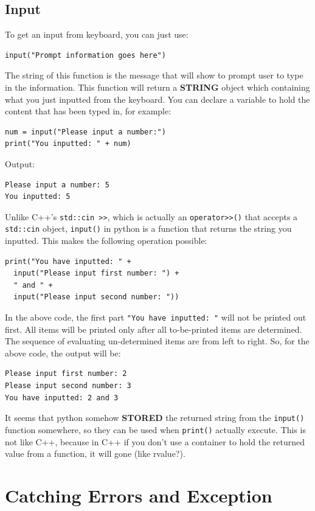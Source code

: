 \documentclass[12pt]{book}
\begin{document}
\section{Input}
\label{sec:org4e30d05}
To get an input from keyboard, you can just use:
\begin{verbatim}
input("Prompt information goes here")
\end{verbatim}
The string of this function is the message that will show to prompt user to type in the information. This function will return a \textbf{STRING} object which containing what you just inputted from the keyboard. You can declare a variable to hold the content that has been typed in, for example:
\begin{verbatim}
num = input("Please input a number:")
print("You inputted: " + num)
\end{verbatim}
Output:
\begin{verbatim}
Please input a number: 5
You inputted: 5
\end{verbatim}

Unlike C++'s \texttt{std::cin >>}, which is actually an \texttt{operator>>()} that accepts a \texttt{std::cin} object, \texttt{input()} in python is a function that returns the string you inputted. This makes the following operation possible:
\begin{verbatim}
print("You have inputted: " +
  input("Please input first number: ") +
  " and " +
  input("Please input second number: "))
\end{verbatim}
In the above code, the first part \texttt{"You have inputted: "} will not be printed out first. All items will be printed only after all to-be-printed items are determined. The sequence of evaluating un-determined items are from left to right. So, for the above code, the output will be:
\begin{verbatim}
Please input first number: 2
Please input second number: 3
You have inputted: 2 and 3
\end{verbatim}

It seems that python somehow \textbf{STORED} the returned string from the \texttt{input()} function somewhere, so they can be used when \texttt{print()} actually execute. This is not like C++, because in C++ if you don't use a container to hold the returned value from a function, it will gone (like rvalue?).
\chapter{Catching Errors and Exception}
\label{sec:orgdd468d9}
\end{document}
